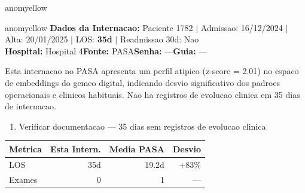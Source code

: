 \documentclass[a4paper,10pt]{article}
\begin{document}
\begin{anomalycard}[Internacao 182309 | PASA | MODERADO (z=2.03)]{anomyellow}

\end{anomalycard}

\newpage

\begin{anomalycard}[Internacao 147898 | PASA | MODERADO (z=2.01)]{anomyellow}
\textbf{Dados da Internacao:} Paciente 1782 $\mid$ Admissao: 16/12/2024 $\mid$ Alta: 20/01/2025 $\mid$ LOS: \textbf{35d} $\mid$ Readmissao 30d: Nao\\
\textbf{Hospital:} Hospital 4\quad\textbf{Fonte:} PASA\quad\textbf{Senha:} ---\quad\textbf{Guia:} ---\\
\vspace{2pt}\begin{tcolorbox}[colback=severityred!20,colframe=anomyellow,title={\textbf{Interpretacao de Negocio}},fonttitle=\bfseries\small,left=4pt,right=4pt,top=3pt,bottom=3pt]
{\small Esta internacao no PASA apresenta um perfil atipico (z-score = 2.01) no espaco de embeddings do gemeo digital, indicando desvio significativo dos padroes operacionais e clinicos habituais. Nao ha registros de evolucao clinica em 35 dias de internacao.}
\end{tcolorbox}
\begin{tcolorbox}[colback=severityyellow!30,colframe=anomorange,title={\textbf{Recomendacoes Especificas}},fonttitle=\bfseries\small,left=4pt,right=4pt,top=3pt,bottom=3pt]
\begin{enumerate}[nosep,leftmargin=16pt]
\item {\small Verificar documentacao --- 35 dias sem registros de evolucao clinica}
\end{enumerate}
\end{tcolorbox}
\begin{center}\begin{tabular}{l r r r}\toprule\textbf{Metrica} & \textbf{Esta Intern.} & \textbf{Media PASA} & \textbf{Desvio} \\\midrule
LOS & 35d & 19.2d & \textcolor{anomorange}{+83\%} \\
Exames & 0 & 1 & --- \\
\bottomrule\end{tabular}\end{center}


\end{anomalycard}
\end{document}
